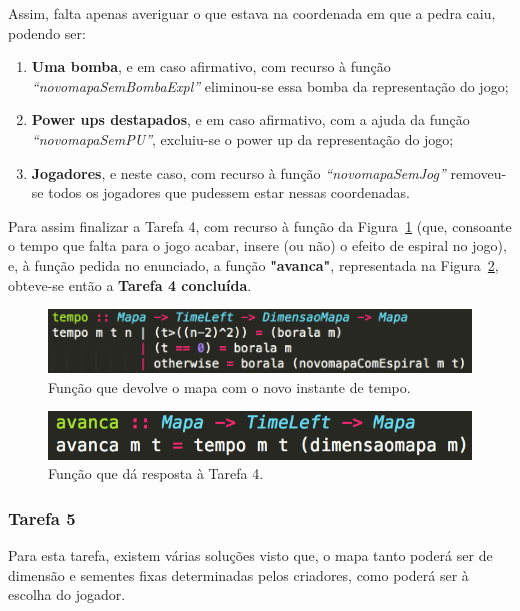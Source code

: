 \documentclass[a4paper]{article}
\begin{document}
Assim, falta apenas averiguar o que estava na coordenada em que a pedra caiu, podendo ser: 

\begin{enumerate} 
	\item \textbf{Uma bomba}, e em caso afirmativo, com recurso à 
	função \emph{“novomapaSemBombaExpl”} eliminou-se essa bomba da representação do jogo;
	\item \textbf{Power ups destapados}, e em caso afirmativo, com a ajuda da função 
	\emph{“novomapaSemPU”}, excluiu-se o power up da representação do jogo;
	\item \textbf{Jogadores}, e neste caso, com recurso à função \emph{“novomapaSemJog”} 
	removeu-se todos os jogadores que pudessem estar nessas coordenadas.
\end{enumerate}

Para assim finalizar a Tarefa 4, com recurso à função da Figura~\ref{img:tempo} (que, consoante o tempo 
que falta para o jogo acabar, insere (ou não) o efeito de espiral no jogo), e, à função pedida no
enunciado, a função \textbf{"avanca"}, representada na Figura~\ref{img:avanca}, 
obteve-se então a \textbf{Tarefa 4 concluída}.

\begin{figure}[H]
\centering 
\includegraphics[scale=0.40]{tempo}
\caption{Função que devolve o mapa com o novo instante de tempo.}
\label{img:tempo}
\end{figure}

\begin{figure}[H]
\centering 
\includegraphics[scale=0.40]{avanca}
\caption{Função que dá resposta à Tarefa 4.}
\label{img:avanca}
\end{figure}

\subsubsection{Tarefa 5}
\label{sec:solucaoTarefa5}

Para esta tarefa, existem várias soluções visto que, o mapa tanto poderá ser de dimensão 
e sementes fixas determinadas pelos criadores, como poderá ser à escolha do jogador.
\end{document}
